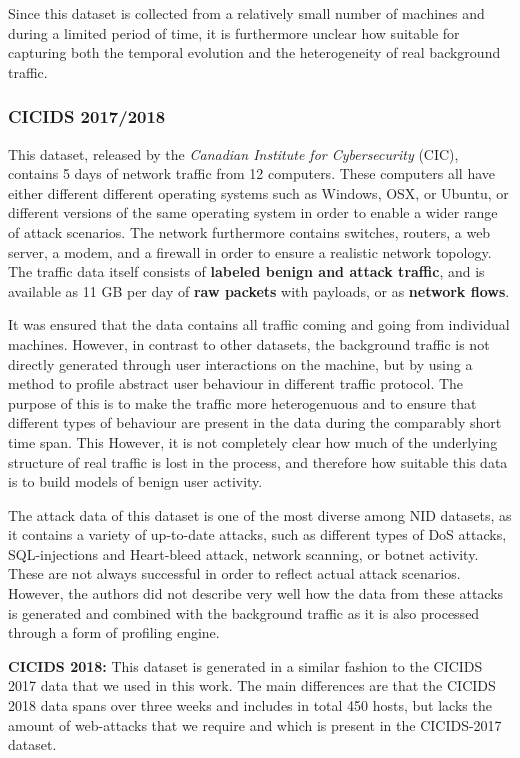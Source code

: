Since this dataset is collected from a relatively small number of machines and during a limited period of time, it is furthermore unclear how suitable for capturing both the temporal evolution and the heterogeneity of real background traffic.

\subsubsection*{CICIDS 2017/2018 \cite{gharib2016evaluation}\cite{sharafaldin2018towards}}

This dataset, released by the \textit{Canadian Institute for Cybersecurity} (CIC), contains 5 days of network traffic from 12 computers. These computers all have either different different operating systems such as Windows, OSX, or Ubuntu, or different versions of the same operating system in order to enable a wider range of attack scenarios. The network  furthermore contains switches, routers, a web server, a modem, and a firewall in order to ensure a realistic network topology. The traffic data itself consists of \textbf{labeled benign and attack traffic}, and is available as 11 GB per day of \textbf{raw packets} with payloads, or as \textbf{network flows}. 

It was ensured that the data contains all traffic coming and going from individual machines. However, in contrast to other datasets, the background traffic is not directly generated through user interactions on the machine, but by using a method to profile abstract user behaviour in different traffic protocol. The purpose of this is to make the traffic more heterogenuous and to ensure that different types of behaviour are present in the data during the comparably short time span. This  However, it is not completely clear how much of the underlying structure of real traffic is lost in the process, and therefore how suitable this data is to build models of benign user activity.

The attack data of this dataset is one of the most diverse among NID datasets, as it contains a variety of up-to-date attacks, such as different types of DoS attacks, SQL-injections and Heart-bleed attack, network scanning, or botnet activity. These are not always successful in order to reflect actual attack scenarios. However, the authors did not describe very well how the data from these attacks is generated and combined with the background traffic as it is also processed through a form of profiling engine. 

\textbf{CICIDS 2018:}
This dataset is generated in a similar fashion to the CICIDS 2017 data that we used in this work. The main differences are that the CICIDS 2018 data spans over three weeks and includes in total 450 hosts, but lacks the amount of web-attacks that we require and which is present in the CICIDS-2017 dataset.

